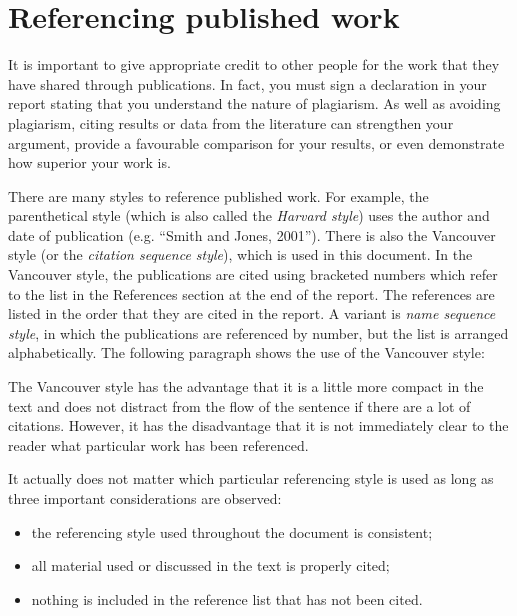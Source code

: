 \section{Referencing published work}
It is important to give appropriate credit to other people for the work that they have shared through publications. In fact, you must sign a declaration in your report stating that you understand the nature of plagiarism. As well as avoiding plagiarism, citing results or data from the literature can strengthen your argument, provide a favourable comparison for your results, or even demonstrate how superior your work is.

There are many styles to reference published work. For example, the parenthetical style (which is also called the \emph{Harvard style}) uses the author and date of publication (e.g. ``Smith and Jones, 2001''). There is also the Vancouver style (or the \emph{citation sequence style}), which is used in this document. In the Vancouver style, the publications are cited using bracketed numbers which refer to the list in the References section at the end of the report. The references are listed in the order that they are cited in the report. A variant is \emph{name sequence style}, in which the publications are referenced by number, but the list is arranged alphabetically. The following paragraph shows the use of the Vancouver style: 


The Vancouver style has the advantage that it is a little more compact in the text and does not distract from the flow of the sentence if there are a lot of citations. However, it has the disadvantage that it is not immediately clear to the reader what particular work has been referenced.

It actually does not matter which particular referencing style is used as long as three important considerations are observed:
\begin{itemize}
	\item the referencing style used throughout the document is consistent;
	\item all material used or discussed in the text is properly cited;
	\item nothing is included in the reference list that has not been cited.
\end{itemize}

